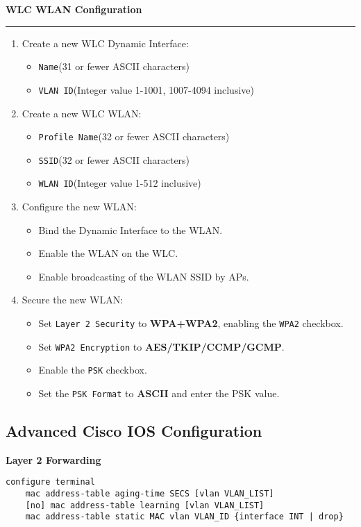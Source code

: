 \documentclass[12pt]{article}
\begin{document}
	\textbf{WLC WLAN Configuration}\hrule
	\begin{enumerate}[leftmargin=*]
		\item{Create a new WLC Dynamic Interface:}
		\begin{itemize}[leftmargin=*, itemsep=-5pt]
			\item{\texttt{Name}\hfill(31 or fewer ASCII characters)}
			\item{\texttt{VLAN ID}\hfill(Integer value 1-1001, 1007-4094 inclusive)}
		\end{itemize}
		\item{Create a new WLC WLAN:}
		\begin{itemize}[leftmargin=*, itemsep=-5pt]
			\item{\texttt{Profile Name}\hfill(32 or fewer ASCII characters)}
			\item{\texttt{SSID}\hfill(32 or fewer ASCII characters)}
			\item{\texttt{WLAN ID}\hfill(Integer value 1-512 inclusive)}
		\end{itemize}
		\item{Configure the new WLAN:}
		\begin{itemize}[leftmargin=*, itemsep=-5pt]
			\item{Bind the Dynamic Interface to the WLAN.}
			\item{Enable the WLAN on the WLC.}
			\item{Enable broadcasting of the WLAN SSID by APs.}
		\end{itemize}
		\item{Secure the new WLAN:}
		\begin{itemize}[leftmargin=*, itemsep=-5pt]
			\item{Set \texttt{Layer 2 Security} to \textbf{WPA+WPA2}, enabling the \texttt{WPA2} checkbox.}
			\item{Set \texttt{WPA2 Encryption} to \textbf{AES/TKIP/CCMP/GCMP}.}
			\item{Enable the \texttt{PSK} checkbox.}
			\item{Set the \texttt{PSK Format} to \textbf{ASCII} and enter the PSK value.}
		\end{itemize}
	\end{enumerate}


	\subsection{Advanced Cisco IOS Configuration}
	\textbf{Layer 2 Forwarding}
	\begin{lstlisting}
configure terminal
	mac address-table aging-time SECS [vlan VLAN_LIST]
	[no] mac address-table learning [vlan VLAN_LIST]
	mac address-table static MAC vlan VLAN_ID {interface INT | drop}
	\end{lstlisting}
\end{document}
